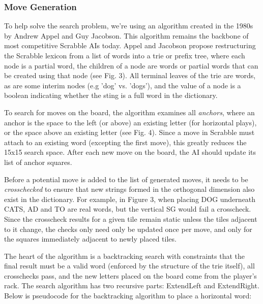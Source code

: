 \documentclass[12pt]{article}
\begin{document}
\subsubsection*{Move Generation}
To help solve the search problem, we're using an algorithm created in
the 1980s by Andrew Appel and Guy Jacobson. This algorithm remains the
backbone of most competitive Scrabble AIs today. Appel and
Jacobson propose restructuring the Scrabble lexicon from a list of
words into a trie or prefix tree, where each node is a partial word,
the children of a node are words or partial words that can be created
using that node (see Fig. 3). All terminal leaves of the trie are
words, as are some interim nodes (e.g 'dog' vs. 'dogs'), and the value
of a node is a boolean indicating whether the sting is a full word in
the dictionary.
  
To search for moves on the board, the algorithm examines all
\emph{anchors}, where an anchor is the space to the left (or above) an
existing letter (for horizontal plays), or the space above an existing
letter (see Fig. 4). Since a move in Scrabble must attach to an
existing word (excepting the first move), this greatly reduces the
15x15 search space. After each new move on the board, the AI should
update its list of anchor squares.

Before a potential move is added to the list of generated moves, it
needs to be \emph{crosschecked} to ensure that new strings formed in
the orthogonal dimension also exist in the dictionary. For example, in
Figure 3, when placing DOG underneath CATS, AD and TO are real words,
but the vertical SG would fail a crosscheck.  Since the crosscheck
results for a given tile remain static unless the tiles adjacent to it
change, the checks only need only be updated once per move, and only for the
squares immediately adjacent to newly placed tiles.

The heart of the algorithm is a backtracking search with constraints
that the final result must be a valid word (enforced by the structure
of the trie itself), all crosschecks pass, and the new letters placed
on the board come from the player's rack. The search algorithm has two
recursive parts: ExtendLeft and ExtendRight. Below is pseudocode for
the backtracking algorithm to place a horizontal word:\\
\end{document}
